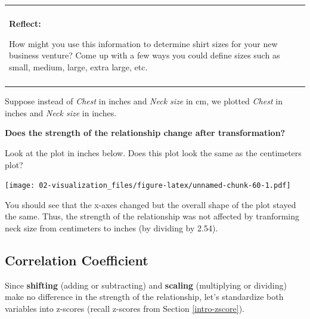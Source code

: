 \documentclass[
]{book}
\newenvironment{Shaded}{\begin{snugshade}}{\end{snugshade}}
\newcommand{\DataTypeTok}[1]{\textcolor[rgb]{0.13,0.29,0.53}{#1}}
\newcommand{\FloatTok}[1]{\textcolor[rgb]{0.00,0.00,0.81}{#1}}
\newcommand{\KeywordTok}[1]{\textcolor[rgb]{0.13,0.29,0.53}{\textbf{#1}}}
\newcommand{\NormalTok}[1]{#1}
\newcommand{\OperatorTok}[1]{\textcolor[rgb]{0.81,0.36,0.00}{\textbf{#1}}}
\newcommand{\StringTok}[1]{\textcolor[rgb]{0.31,0.60,0.02}{#1}}
\newenvironment{reflect}
{
    \begin{center}
    
    \begin{tabular}{|p{0.8\textwidth}|}
    \rowcolor{LightBlue}
    \hline\\
    \rowcolor{LightBlue}
    \textbf{Reflect:}
}
{
    \\\rowcolor{LightBlue}
    \\\hline
    \end{tabular} 
    \end{center}
}
\begin{document}
\begin{reflect}
How might you use this information to determine shirt sizes for your new
business venture? Come up with a few ways you could define sizes such as
small, medium, large, extra large, etc.
\end{reflect}

Suppose instead of \emph{Chest} in inches and \emph{Neck size} in cm, we plotted \emph{Chest} in inches and \emph{Neck size} in inches.

\textbf{Does the strength of the relationship change after transformation?}

Look at the plot in inches below. Does this plot look the same as the centimeters plot?

\begin{Shaded}
\end{Shaded}

\texttt{[image: 02-visualization\_files/figure-latex/unnamed-chunk-60-1.pdf]}

You should see that the x-axes changed but the overall shape of the plot stayed the same. Thus, the strength of the relationship was not affected by tranforming neck size from centimeters to inches (by dividing by 2.54).

\hypertarget{correlation-coefficient}{%
\subsection{Correlation Coefficient}\label{correlation-coefficient}}

Since \textbf{shifting} (adding or subtracting) and \textbf{scaling} (multiplying or dividing) make no difference in the strength of the relationship, let's standardize both variables into z-scores (recall z-scores from Section \ref{intro-zscore}).
\end{document}
